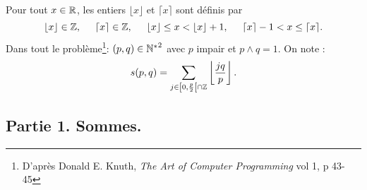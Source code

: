 \noindent
Pour tout $x \in \mathbb{R}$, les entiers $\lfloor x \rfloor$ et $\lceil x \rceil$ sont définis par 
\[
\lfloor x \rfloor\in \mathbb{Z}, \hspace{0.5cm} \lceil x \rceil \in \mathbb{Z}, \hspace{0.5cm} \lfloor x \rfloor \leq x < \lfloor x \rfloor +1, \hspace{0.5cm} \lceil x \rceil -1 < x \leq \lceil x \rceil. 
\]
Dans tout le problème\footnote{D'après Donald E. Knuth, \emph{The Art of Computer Programming} vol 1, p 43-45}: $(p,q) \in {\mathbb{N}^*}^2$ avec $p$ impair et $p\wedge q = 1$. On note :
\[
  s(p,q) = \sum_{j \in \left[0, \frac{p}{2}\right[\cap \mathbb{Z}} \left\lfloor \frac{j q}{p}\right\rfloor .
\]

\subsection*{Partie 1. Sommes.}
